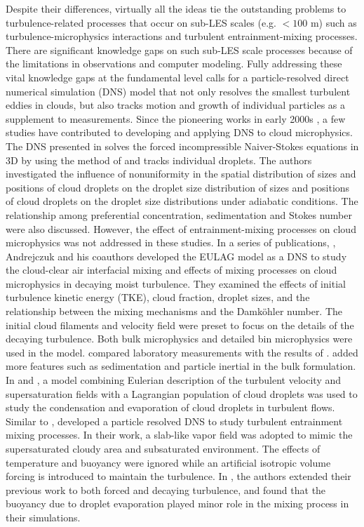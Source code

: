 \documentclass[draft,jgrga]{AGUTeX}
\begin{document}
\begin{article}
Despite their differences, virtually all the ideas tie the outstanding problems to turbulence-related processes that occur on sub-LES scales (e.g. $< 100$ m) such as turbulence-microphysics interactions and turbulent entrainment-mixing processes. There are significant knowledge gaps on such sub-LES scale processes because of the limitations in observations and computer modeling. Fully addressing these vital knowledge gaps at the fundamental level calls for a particle-resolved direct numerical simulation (DNS) model that not only resolves the smallest turbulent eddies in clouds, but also tracks motion and growth of individual particles as a supplement to measurements. Since the pioneering works in early 2000s \cite{Vaillancourt00, Vaillancourt02}, a few studies have contributed to developing and applying DNS to cloud microphysics. The DNS presented in \cite{Vaillancourt00, Vaillancourt02} solves the forced incompressible Naiver-Stokes equations in 3D by using the method of \cite{Sullivan1994} and tracks individual droplets. The authors investigated the influence of nonuniformity in the spatial distribution of sizes and positions of cloud droplets on the droplet size distribution of sizes and positions of cloud droplets on the droplet size distributions under adiabatic conditions. The relationship among preferential concentration, sedimentation and Stokes number were also discussed. However, the effect of entrainment-mixing processes on cloud microphysics was not addressed in these studies. In a series of publications, \cite{And04, And06, And09}, Andrejczuk and his coauthors developed the EULAG model as a DNS to study the cloud-clear air interfacial mixing and effects of mixing processes on cloud microphysics in decaying moist turbulence. They examined the effects of initial turbulence kinetic energy (TKE), cloud fraction, droplet sizes, and the relationship between the mixing mechanisms and the Damk\"{o}hler number. The initial cloud filaments and velocity field were preset to focus on the details of the decaying turbulence. Both bulk microphysics and detailed bin microphysics were used in the model. \cite{Malinowski2008} compared laboratory measurements with the results of \cite{And04, And06}. \cite{LozarMellado2013} added more features such as sedimentation and particle inertial in the bulk formulation. In \cite{Lanotte2009} and \cite{Celani05}, a model combining Eulerian description of the turbulent velocity and supersaturation fields with a Lagrangian population of cloud droplets was used to study the condensation and evaporation of cloud droplets in turbulent flows. Similar to  \cite{Vaillancourt02, Lanotte2009}, \cite{Kumar11, Kumar12} developed a particle resolved DNS to study turbulent entrainment mixing processes. In their work, a slab-like vapor field was adopted to mimic the supersaturated cloudy area and subsaturated environment. The effects of temperature and buoyancy were ignored while an artificial isotropic volume forcing is introduced to maintain the turbulence. In \cite{Kumar14}, the authors extended their previous work to both forced and decaying turbulence, and found that the buoyancy due to droplet evaporation played minor role in the mixing process in their simulations.


\end{article}
\end{document}
